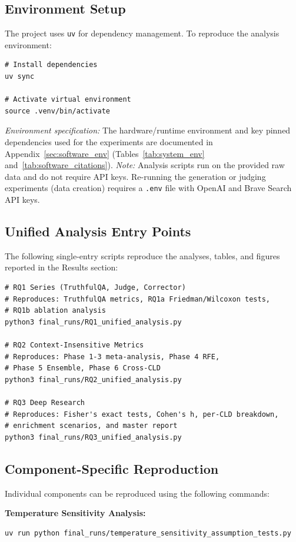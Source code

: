 \subsection{Environment Setup}
The project uses \texttt{uv} for dependency management. To reproduce the analysis environment:
\begin{verbatim}
# Install dependencies
uv sync

# Activate virtual environment
source .venv/bin/activate
\end{verbatim}
\textit{Environment specification:} The hardware/runtime environment and key pinned dependencies used for the experiments are documented in Appendix~\ref{sec:software_env} (Tables~\ref{tab:system_env} and~\ref{tab:software_citations}).
\textit{Note:} Analysis scripts run on the provided raw data and do not require API keys. Re-running the generation or judging experiments (data creation) requires a \texttt{.env} file with OpenAI and Brave Search API keys.

\subsection{Unified Analysis Entry Points}
The following single-entry scripts reproduce the analyses, tables, and figures reported in the Results section:

\begin{verbatim}
# RQ1 Series (TruthfulQA, Judge, Corrector)
# Reproduces: TruthfulQA metrics, RQ1a Friedman/Wilcoxon tests,
# RQ1b ablation analysis
python3 final_runs/RQ1_unified_analysis.py

# RQ2 Context-Insensitive Metrics
# Reproduces: Phase 1-3 meta-analysis, Phase 4 RFE,
# Phase 5 Ensemble, Phase 6 Cross-CLD
python3 final_runs/RQ2_unified_analysis.py

# RQ3 Deep Research
# Reproduces: Fisher's exact tests, Cohen's h, per-CLD breakdown,
# enrichment scenarios, and master report
python3 final_runs/RQ3_unified_analysis.py
\end{verbatim}

\subsection{Component-Specific Reproduction}
Individual components can be reproduced using the following commands:

\textbf{Temperature Sensitivity Analysis:}
\begin{verbatim}
uv run python final_runs/temperature_sensitivity_assumption_tests.py
\end{verbatim}

